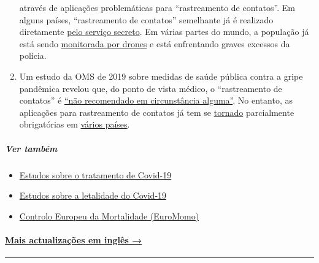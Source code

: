\begin{enumerate}
  através de aplicações problemáticas para ``rastreamento de contatos''.
  Em alguns países, ``rastreamento de contatos'' semelhante já é
  realizado diretamente
  \href{https://www.jewishpress.com/news/the-courts/state-to-high-court-even-more-shin-bet-involvement-in-fighting-the-coronavirus/2020/04/14/}{pelo
  serviço secreto}. Em várias partes do mundo, a população já está sendo
  \href{https://off-guardian.org/2020/04/25/50-headlines-darker-more-of-the-new-normal/}{monitorada
  por drones} e está enfrentando graves excessos da polícia.
\item
  Um estudo da OMS de 2019 sobre medidas de saúde pública contra a gripe
  pandêmica revelou que, do ponto de vista médico, o ``rastreamento de
  contatos'' é
  \href{https://apps.who.int/iris/bitstream/handle/10665/329438/9789241516839-eng.pdf\#page=9}{``não
  recomendado em circunstância alguma''}. No entanto, as aplicações para
  rastreamento de contatos já tem se
  \href{https://www.heise.de/tp/features/CuidAR-Argentinien-ueberwacht-mit-einer-App-4720143.html}{tornado}
  parcialmente obrigatórias em
  \href{https://www.technologyreview.com/2020/05/07/1001360/india-aarogya-setu-covid-app-mandatory/}{vários
  países}.
\end{enumerate}

\hypertarget{ver-tambuxe9m}{%
\subparagraph{\texorpdfstring{\textbf{Ver
também}}{Ver também}}\label{ver-tambuxe9m}}

\begin{itemize}
\tightlist
\item
  \href{https://swprs.org/on-the-treatment-of-covid-19/}{Estudos sobre o
  tratamento de Covid-19}
\item
  \href{https://swprs.org/studies-on-covid-19-lethality/}{Estudos sobre
  a letalidade do Covid-19}
\item
  \href{https://www.euromomo.eu/}{Controlo Europeu da Mortalidade
  (EuroMomo)}
\end{itemize}

\hypertarget{mais-actualizauxe7uxf5es-em-ingluxeas-}{%
\paragraph{\texorpdfstring{\href{https://swprs.org/a-swiss-doctor-on-covid-19/}{Mais
actualizações em inglês
→}}{Mais actualizações em inglês →}}\label{mais-actualizauxe7uxf5es-em-ingluxeas-}}

\begin{center}\rule{0.5\linewidth}{\linethickness}\end{center}

